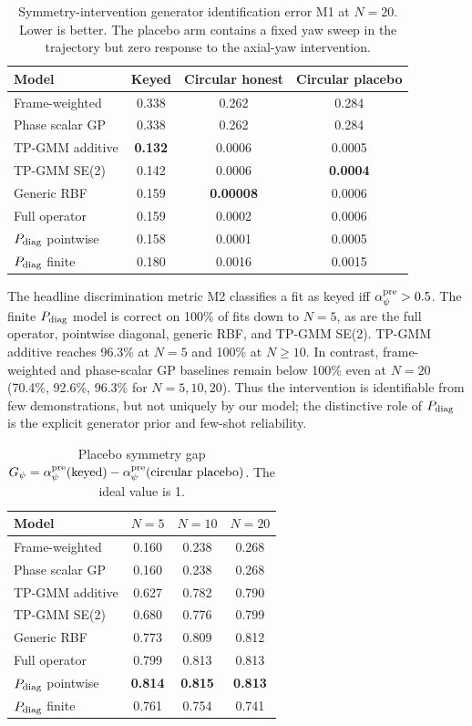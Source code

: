 \documentclass[letterpaper,10pt,conference]{ieeeconf}
\begin{document}
\begin{table}[t]
\centering
\caption{Symmetry-intervention generator identification error M1 at $N=20$.
Lower is better. The placebo arm contains a fixed yaw sweep in the trajectory
but zero response to the axial-yaw intervention.}
\label{tab:sym_m1}
\small
\setlength{\tabcolsep}{5.0pt}
\begin{tabular}{lccc}
\toprule
Model & Keyed & Circular honest & Circular placebo\\
\midrule
Frame-weighted & 0.338 & 0.262 & 0.284\\
Phase scalar GP & 0.338 & 0.262 & 0.284\\
TP-GMM additive & \textbf{0.132} & 0.0006 & 0.0005\\
TP-GMM SE(2) & 0.142 & 0.0006 & \textbf{0.0004}\\
Generic RBF & 0.159 & \textbf{0.00008} & 0.0006\\
Full operator & 0.159 & 0.0002 & 0.0006\\
$P_{\rm diag}$ pointwise & 0.158 & 0.0001 & 0.0005\\
$P_{\rm diag}$ finite & 0.180 & 0.0016 & 0.0015\\
\bottomrule
\end{tabular}
\end{table}

The headline discrimination metric M2 classifies a fit as keyed iff
$\alpha_\psi^{\rm pre}>0.5$. The finite $P_{\rm diag}$ model is correct on
100\% of fits down to $N=5$, as are the full operator, pointwise diagonal,
generic RBF, and TP-GMM SE(2). TP-GMM additive reaches 96.3\% at $N=5$ and
100\% at $N\geq10$. In contrast, frame-weighted and phase-scalar GP baselines
remain below 100\% even at $N=20$ (70.4\%, 92.6\%, 96.3\% for
$N=5,10,20$). Thus the intervention is identifiable from few demonstrations,
but not uniquely by our model; the distinctive role of $P_{\rm diag}$ is the
explicit generator prior and few-shot reliability.

\begin{table}[t]
\centering
\caption{Placebo symmetry gap
$G_\psi=\alpha_\psi^{\rm pre}(\mathrm{keyed})-
\alpha_\psi^{\rm pre}(\mathrm{circular\ placebo})$. The ideal value is 1.}
\label{tab:sym_gap}
\small
\setlength{\tabcolsep}{4.0pt}
\begin{tabular}{lccc}
\toprule
Model & $N=5$ & $N=10$ & $N=20$\\
\midrule
Frame-weighted & 0.160 & 0.238 & 0.268\\
Phase scalar GP & 0.160 & 0.238 & 0.268\\
TP-GMM additive & 0.627 & 0.782 & 0.790\\
TP-GMM SE(2) & 0.680 & 0.776 & 0.799\\
Generic RBF & 0.773 & 0.809 & 0.812\\
Full operator & 0.799 & 0.813 & 0.813\\
$P_{\rm diag}$ pointwise & \textbf{0.814} & \textbf{0.815} & \textbf{0.813}\\
$P_{\rm diag}$ finite & 0.761 & 0.754 & 0.741\\
\bottomrule
\end{tabular}
\end{table}
\end{document}
